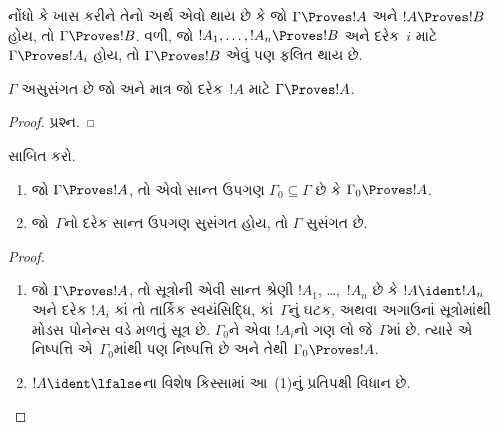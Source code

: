 

નોંધો કે ખાસ કરીને તેનો અર્થ એવો થાય છે કે જો $\Gamma \Proves !A$ અને
$!A \Proves !B$ હોય, તો $\Gamma \Proves !B$. વળી, જો
$!A_1, \dots, !A_n \Proves !B$ અને દરેક~$i$ માટે
$\Gamma \Proves !A_i$ હોય, તો $\Gamma \Proves !B$ એવું પણ ફલિત થાય છે.

\begin{prop}
$\Gamma$ અસુસંગત છે જો અને માત્ર જો દરેક~$!A$ માટે
$\Gamma \Proves !A$.
\end{prop}

\begin{proof}
પ્રશ્ન.
\end{proof}

\begin{prob}
 સાબિત કરો.
\end{prob}



\begin{prop}[સઘનતા]
  \begin{enumerate}
  \item જો $\Gamma \Proves !A$, તો એવો સાન્ત ઉપગણ $\Gamma_0
    \subseteq \Gamma$ છે કે $\Gamma_0 \Proves !A$.
  \item જો~$\Gamma$નો દરેક સાન્ત ઉપગણ સુસંગત હોય, તો $\Gamma$
    સુસંગત છે.
  \end{enumerate}
\end{prop}

\begin{proof}
  \begin{enumerate}
    \item જો $\Gamma \Proves !A$, તો સૂત્રોની એવી સાન્ત શ્રેણી
      $!A_1$, \dots,~$!A_n$ છે કે $!A \ident !A_n$ અને દરેક $!A_i$
      કાં તો તાર્કિક સ્વયંસિદ્ધિ, કાં~$\Gamma$નું ઘટક, અથવા
      અગાઉનાં સૂત્રોમાંથી મોડસ પોનેન્સ વડે મળતું સૂત્ર છે.
      $\Gamma_0$ને એવા $!A_i$નો ગણ લો જે~$\Gamma$માં છે. ત્યારે એ
      નિષ્પત્તિ એ~$\Gamma_0$માંથી પણ નિષ્પત્તિ છે અને તેથી
      $\Gamma_0 \Proves !A$.
    \item $!A \ident \lfalse$ના વિશેષ કિસ્સામાં આ~(1)નું
      પ્રતિપક્ષી વિધાન છે.
\end{enumerate}
\end{proof}
\endgroup


